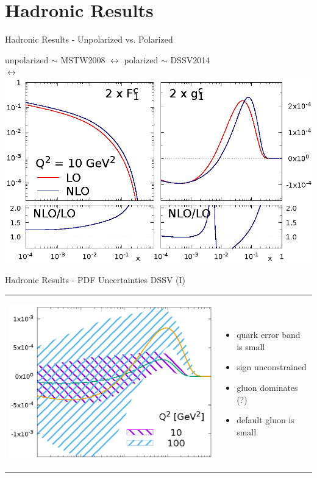 \section{Hadronic Results}
\begin{frame}{Hadronic Results - Unpolarized vs. Polarized}
\begin{center}
unpolarized $\sim$ MSTW2008 $\leftrightarrow$ polarized $\sim$ DSSV2014\quad\,\,\,\\
\quad\quad\quad{} $\leftrightarrow$ 
\includegraphics[width=.8\textwidth]{img/F1g1}
\end{center}
\end{frame}

\begin{frame}{Hadronic Results - PDF Uncertainties DSSV (I)}
\begin{tabular}{wn}
\begin{center}
\includegraphics[width=.65\textwidth]{img/g1NLO-pdf}
\end{center} & 
\begin{itemize}
\item quark error band is small
\item sign unconstrained
\item gluon dominates (?)
\item default gluon is small
\end{itemize}
\end{tabular}
\end{frame}


